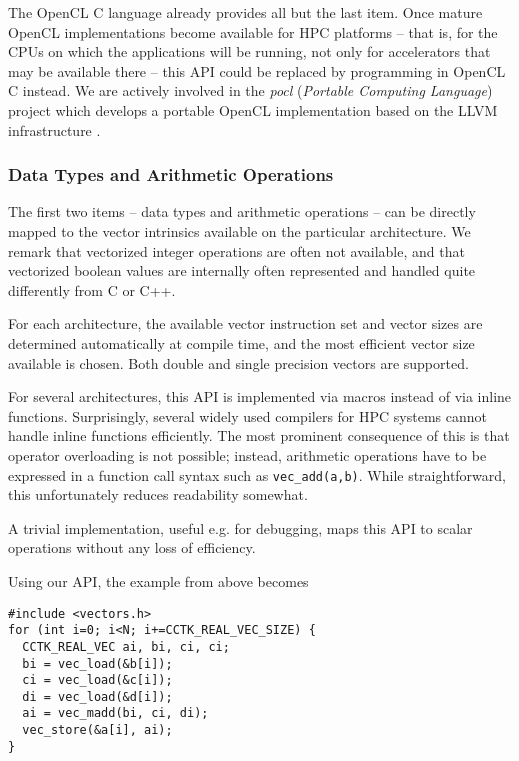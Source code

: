 \documentclass[conference]{IEEEtran}
\begin{document}
The OpenCL C language already provides all but the last item. Once
mature OpenCL implementations become available for HPC platforms --
that is, for the CPUs on which the applications will be running, not
only for accelerators that may be available there -- this API could be
replaced by programming in OpenCL C instead.
We are actively involved in the \emph{pocl}
(\emph{Portable Computing Language}) project \cite{poclweb} which
develops a portable OpenCL implementation based on the LLVM infrastructure
\cite{llvmweb}.

\subsubsection{Data Types and Arithmetic Operations}

The first two items -- data types and arithmetic operations -- can be
directly mapped to the vector intrinsics available on the particular
architecture. We remark that vectorized integer operations are often
not available, and that vectorized boolean values are internally often
represented and handled quite differently from C or C++.

For each architecture, the available vector instruction set and vector
sizes are determined automatically at compile time, and the most
efficient vector size available is chosen. Both double and single
precision vectors are supported.

For several architectures, this API is implemented via macros instead
of via inline functions. Surprisingly, several widely used compilers
for HPC systems cannot handle inline functions efficiently. The most
prominent consequence of this is that operator overloading is not
possible; instead, arithmetic operations have to be expressed in a
function call syntax such as \verb+vec_add(a,b)+. While
straightforward, this unfortunately reduces readability somewhat.

A trivial implementation, useful e.g. for debugging, maps this API to
scalar operations without any loss of efficiency.

Using our API, the example from above becomes

\begin{small}
\begin{verbatim}
#include <vectors.h>
for (int i=0; i<N; i+=CCTK_REAL_VEC_SIZE) {
  CCTK_REAL_VEC ai, bi, ci, ci;
  bi = vec_load(&b[i]);
  ci = vec_load(&c[i]);
  di = vec_load(&d[i]);
  ai = vec_madd(bi, ci, di);
  vec_store(&a[i], ai);
}
\end{verbatim}
\end{small}
\end{document}
